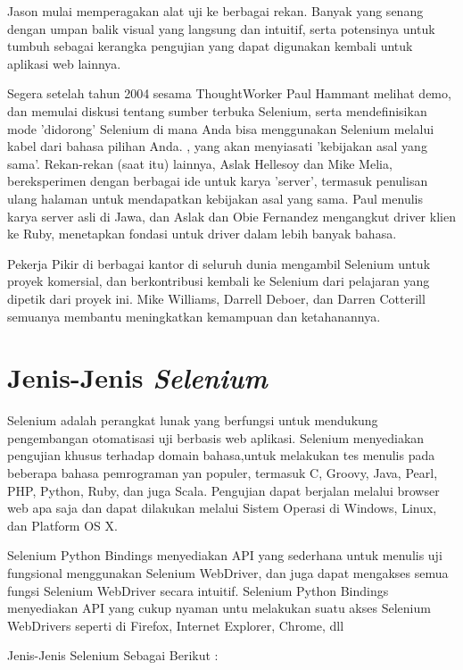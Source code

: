 \par Jason mulai memperagakan alat uji ke berbagai rekan. Banyak yang senang dengan umpan balik visual yang langsung dan intuitif, serta potensinya untuk tumbuh sebagai kerangka pengujian yang dapat digunakan kembali untuk aplikasi web lainnya.

\par Segera setelah tahun 2004 sesama ThoughtWorker Paul Hammant melihat demo, dan memulai diskusi tentang sumber terbuka Selenium, serta mendefinisikan mode 'didorong' Selenium di mana Anda bisa menggunakan Selenium melalui kabel dari bahasa pilihan Anda. , yang akan menyiasati 'kebijakan asal yang sama'. Rekan-rekan (saat itu) lainnya, Aslak Hellesoy dan Mike Melia, bereksperimen dengan berbagai ide untuk karya 'server', termasuk penulisan ulang halaman untuk mendapatkan kebijakan asal yang sama. Paul menulis karya server asli di Jawa, dan Aslak dan Obie Fernandez mengangkut driver klien ke Ruby, menetapkan fondasi untuk driver dalam lebih banyak bahasa.

\par Pekerja Pikir di berbagai kantor di seluruh dunia mengambil Selenium untuk proyek komersial, dan berkontribusi kembali ke Selenium dari pelajaran yang dipetik dari proyek ini. Mike Williams, Darrell Deboer, dan Darren Cotterill semuanya membantu meningkatkan kemampuan dan ketahanannya.

\section{Jenis-Jenis \textit{Selenium} \textit{}}
Selenium adalah perangkat lunak yang berfungsi untuk mendukung pengembangan otomatisasi uji berbasis web aplikasi. Selenium menyediakan pengujian khusus terhadap domain bahasa,untuk melakukan tes menulis pada beberapa bahasa pemrograman yan populer, termasuk C, Groovy, Java, Pearl, PHP, Python, Ruby, dan juga Scala. Pengujian dapat berjalan melalui browser web apa saja dan dapat dilakukan melalui Sistem Operasi di Windows, Linux, dan Platform OS X. 
\par Selenium Python Bindings menyediakan API yang sederhana untuk menulis uji fungsional menggunakan Selenium WebDriver, dan juga dapat mengakses semua fungsi Selenium WebDriver secara intuitif. Selenium Python Bindings menyediakan API yang cukup nyaman untu melakukan suatu akses Selenium WebDrivers seperti di Firefox, Internet Explorer, Chrome, dll 

Jenis-Jenis Selenium Sebagai Berikut :

